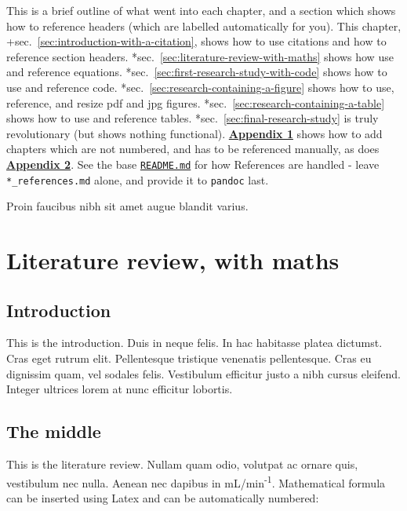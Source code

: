 \documentclass[12pt,a4paper,]{report}
\begin{document}
This is a brief outline of what went into each chapter, and a section
which shows how to reference headers (which are labelled automatically
for you). This chapter, +sec.~\ref{sec:introduction-with-a-citation},
shows how to use citations and how to reference section headers.
*sec.~\ref{sec:literature-review-with-maths} shows how use and reference
equations. *sec.~\ref{sec:first-research-study-with-code} shows how to
use and reference code. *sec.~\ref{sec:research-containing-a-figure}
shows how to use, reference, and resize pdf and jpg figures.
*sec.~\ref{sec:research-containing-a-table} shows how to use and
reference tables. *sec.~\ref{sec:final-research-study} is truly
revolutionary (but shows nothing functional).
\textbf{\protect\hyperlink{appendix-1-some-extra-stuff}{Appendix 1}}
shows how to add chapters which are not numbered, and has to be
referenced manually, as does
\textbf{\protect\hyperlink{appendix-2-some-more-extra-stuff}{Appendix
2}}. See the base
\href{https://github.com/tompollard/phd_thesis_markdown/blob/master/README.md}{\texttt{README.md}}
for how References are handled - leave \texttt{*\_references.md} alone,
and provide it to \texttt{pandoc} last.

Proin faucibus nibh sit amet augue blandit varius.

\hypertarget{literature-review-with-maths}{%
\chapter{Literature review, with
maths}\label{literature-review-with-maths}}

\hypertarget{introduction}{%
\section{Introduction}\label{introduction}}

This is the introduction. Duis in neque felis. In hac habitasse platea
dictumst. Cras eget rutrum elit. Pellentesque tristique venenatis
pellentesque. Cras eu dignissim quam, vel sodales felis. Vestibulum
efficitur justo a nibh cursus eleifend. Integer ultrices lorem at nunc
efficitur lobortis.

\hypertarget{the-middle}{%
\section{The middle}\label{the-middle}}

This is the literature review. Nullam quam odio, volutpat ac ornare
quis, vestibulum nec nulla. Aenean nec dapibus in
mL/min\textsuperscript{-1}. Mathematical formula can be inserted using
Latex and can be automatically numbered:
\end{document}
